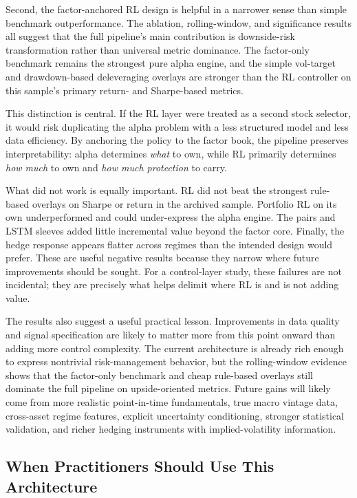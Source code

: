 \documentclass[10pt,twocolumn]{article}
\begin{document}
Second, the factor-anchored RL design is helpful in a narrower sense than simple
benchmark outperformance. The ablation, rolling-window, and significance results
all suggest that the full pipeline's main contribution is downside-risk
transformation rather than universal metric dominance. The factor-only benchmark
remains the strongest pure alpha engine, and the simple vol-target and
drawdown-based deleveraging overlays are stronger than the RL controller on this
sample's primary return- and Sharpe-based metrics.

This distinction is central. If the RL layer were treated as a second stock
selector, it would risk duplicating the alpha problem with a less structured
model and less data efficiency. By anchoring the policy to the factor book, the
pipeline preserves interpretability: alpha determines \emph{what} to own, while
RL primarily determines \emph{how much} to own and \emph{how much protection} to
carry.

What did not work is equally important. RL did not beat the strongest
rule-based overlays on Sharpe or return in the archived sample. Portfolio RL on
its own underperformed and could under-express the alpha engine. The pairs and
LSTM sleeves added little incremental value beyond the factor core. Finally, the
hedge response appears flatter across regimes than the intended design would
prefer. These are useful negative results because they narrow where future
improvements should be sought. For a control-layer study, these failures are not
incidental; they are precisely what helps delimit where RL is and is not adding
value.

The results also suggest a useful practical lesson. Improvements in data quality
and signal specification are likely to matter more from this point onward than
adding more control complexity. The current architecture is already rich enough
to express nontrivial risk-management behavior, but the rolling-window evidence
shows that the factor-only benchmark and cheap rule-based overlays still dominate
the full pipeline on upside-oriented metrics. Future gains will likely come
from more realistic point-in-time fundamentals, true macro vintage data,
cross-asset regime features, explicit uncertainty conditioning, stronger
statistical validation, and richer hedging instruments with implied-volatility
information.

\subsection{When Practitioners Should Use This Architecture}
\end{document}
